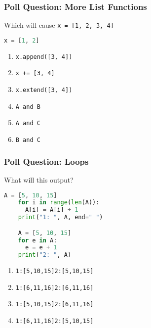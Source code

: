 \documentclass{beamer}
\begin{document}
%
%
\begin{frame}[fragile]
  \frametitle{Poll Question: More List Functions}
  Which will cause \lstinline|x = [1, 2, 3, 4]|
  \begin{lstlisting}[language=Python, autogobble]
  x = [1, 2]
  \end{lstlisting}
  \vfill
  \begin{enumerate}[A]
    \item \lstinline|x.append([3, 4])|
    \item \lstinline|x += [3, 4]|
    \item \lstinline|x.extend([3, 4])|
    \item \lstinline|A and B|
    \item \lstinline|A and C|
    \item \lstinline|B and C|
  \end{enumerate}
\end{frame}

%
%
\begin{frame}[fragile]
  \frametitle{Poll Question: Loops}
  What will this output?\\
  \begin{minipage}{0.48\textwidth}
    \begin{lstlisting}[language=Python, autogobble]
    A = [5, 10, 15]
    for i in range(len(A)):
      A[i] = A[i] + 1
    print("1: ", A, end=" ")

    A = [5, 10, 15]
    for e in A:
      e = e + 1
    print("2: ", A)
    \end{lstlisting}
  \end{minipage}
  \hfill
  \begin{minipage}{0.48\textwidth}
    \begin{enumerate}[A]
      \item \lstinline|1:[5,10,15]2:[5,10,15]|
      \item \lstinline|1:[6,11,16]2:[6,11,16]|
      \item \lstinline|1:[5,10,15]2:[6,11,16]|
      \item \lstinline|1:[6,11,16]2:[5,10,15]|
    \end{enumerate}
  \end{minipage}
\end{frame}
\end{document}
